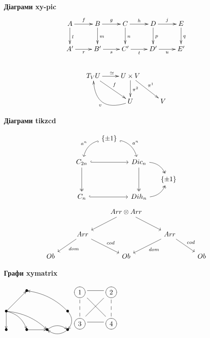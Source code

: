 \documentclass[14pt]{extarticle}
\begin{document}
    \textbf{Діаграми xy-pic}
    \begin{gather*}
        \xymatrix{
            A \ar[r]^{f} \ar[d]^{l} & B \ar[r]^{g} \ar[d]^{m} & C \ar[r]^{h} \ar[d]^{n} & D \ar[r]^{j} \ar[d]^{p} & E \ar[d]^{q} \\
            A' \ar[r]_{r} & B' \ar[r]_{s} & C' \ar[r]_{t} & D' \ar[r]_{u} & E' \\
        } \\
        \hspace{5cm} \\
        \xymatrix{
            T_V U \ar[r]^{\simeq} \ar[rd]^{f} & U \times V \ar[d]^{\pi ^ 2} \ar[rd]^{\pi ^ 1} \\
            & U \ar@/^{2pc}/[ul]^{v} & V
        }\\
    \end{gather*}

    \textbf{Діаграми tikzcd}

    \[
        \begin{tikzcd}[column sep=small,row sep=small]
            & \{\pm 1\} \arrow[hook,bend right,swap]{ldd}{a ^ n} \arrow[hook',bend left]{rdd}{a ^ n} \\
            & & & \\
            C_{2 n} \arrow[hook]{rr} \arrow[two heads]{dd} & & Dic_n \arrow[two heads]{dd} \arrow[bend left,two heads]{rd} \\
            & & & \{\pm 1\} \\
            C_n \arrow[hook]{rr} & & Dih_n \arrow[bend right,two heads]{ru}
        \end{tikzcd}
    \]
    \[
        \begin{tikzcd}
            & & Arr \otimes Arr \arrow{ld} \arrow{rd} \\
            & Arr \arrow{ld}{dom} \arrow{rd}{cod} & & Arr \arrow{ld}{dom} \arrow{rd}{cod} \\
            Ob & & Ob & & Ob
        \end{tikzcd}
    \]

    \textbf{Графи xymatrix}

    \begin{center}
        $
        \xymatrix{
            &*=0{\bullet}&&\\
            *=0{\bullet}
            \ar[d]
            \ar[ur]
            \ar@/^/[dr]
            \ar@/^/[drr]
            &&&*=0{\bullet}\ar@/^/[d]\ar@/_/[ull]
            \\
            *=0{\bullet}
            &*=0{\bullet}\ar[r]
            &*=0{\bullet}\ar@/^/[r]
            &*=0{\bullet}\ar@/^/[l]
        }
        $
        \hspace{1cm}
        $
        \xymatrix{
            \xy*{1}*\cir<8pt>{}\endxy\ar@{-}[r]                      & \xy*{2}*\cir<8pt>{}\endxy\ar@{--}[d]  \\
            \xy*{3}*\cir<8pt>{}\endxy\ar@{-}[ur]\ar@{-}[r]\ar@{--}[u] & \xy*{4}*\cir<8pt>{}\endxy\ar@{-}[lu]
        }
        $
    \end{center}
\end{document}
